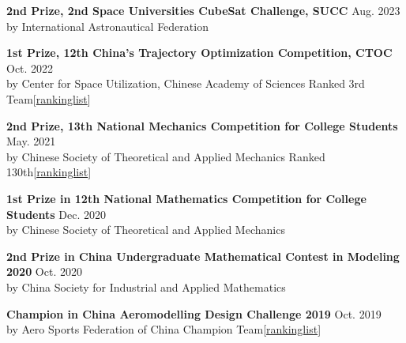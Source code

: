 \documentclass[11pt, a4paper]{article}
\begin{document}
\begin{researchitem}
    \item \textbf{2nd Prize, 2nd Space Universities CubeSat Challenge, SUCC} \hfill Aug. 2023 \\
    \hfill by International Astronautical Federation 
    \item \textbf{1st Prize, 12th China’s Trajectory Optimization Competition, CTOC} \hfill Oct. 2022 \\by Center for Space Utilization, Chinese Academy of Sciences  
   \hfill Ranked 3rd Team[\href{http://ctoc12.spacestdc.com/#/rankingList/list1}{rankinglist}]
    \item \textbf{2nd Prize, 13th National Mechanics Competition for College Students} \hfill May. 2021 \\by Chinese Society of Theoretical and Applied Mechanics \hfill Ranked 130th[\href{https://mp.weixin.qq.com/s/rHGK20gDRQktuhssOsNU8Q}{rankinglist}]
    \item \textbf{1st Prize in 12th National Mathematics Competition for College Students} \hfill Dec. 2020 \\ 
    \hfill
    by Chinese Society of Theoretical and Applied Mechanics
    \item \textbf{2nd Prize in China Undergraduate Mathematical Contest in Modeling 2020} \hfill Oct. 2020 \\ 
    by China Society for Industrial and Applied Mathematics
    \item \textbf{Champion in China Aeromodelling Design Challenge 2019} \hfill Oct. 2019 \\by Aero Sports Federation of China 
    \hfill Champion Team[\href{https://xhimg.sports.cn/Image/soft/191119/6-1911191HK5W4.pdf}{rankinglist}] 

\end{researchitem}
\end{document}
